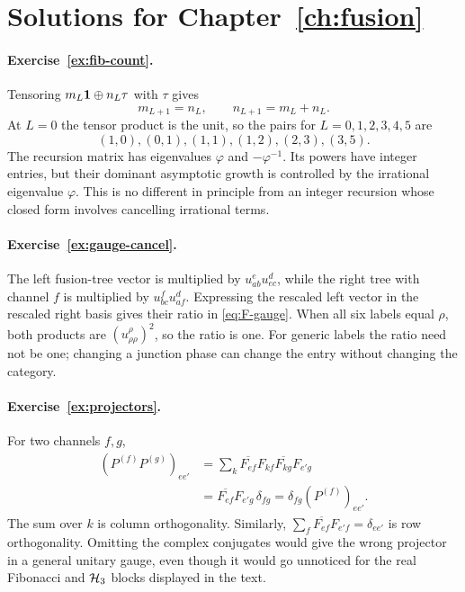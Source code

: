 \section{Solutions for Chapter~\ref{ch:fusion}}

\paragraph{Exercise~\ref{ex:fib-count}.}
\label{sol:ex:fib-count}
Tensoring $m_L\mathbf1\oplus n_L\tau$ with $\tau$ gives
\[
 m_{L+1}=n_L,\qquad n_{L+1}=m_L+n_L.
\]
At $L=0$ the tensor product is the unit, so the pairs for
$L=0,1,2,3,4,5$ are
\[
 (1,0),(0,1),(1,1),(1,2),(2,3),(3,5).
\]
The recursion matrix has eigenvalues $\varphi$ and
$-\varphi^{-1}$.  Its powers have integer entries, but their dominant
asymptotic growth is controlled by the irrational eigenvalue
$\varphi$.  This is no different in principle from an integer
recursion whose closed form involves cancelling irrational terms.



\paragraph{Exercise~\ref{ex:gauge-cancel}.}
\label{sol:ex:gauge-cancel}
The left fusion-tree vector is multiplied by
$u_{ab}^{e}u_{ec}^{d}$, while the right tree with channel $f$ is
multiplied by $u_{bc}^{f}u_{af}^{d}$.  Expressing the rescaled left
vector in the rescaled right basis gives their ratio in
\eqref{eq:F-gauge}.  When all six labels equal $\rho$, both
products are $(u_{\rho\rho}^{\rho})^2$, so the ratio is one.
For generic labels the ratio need not be one; changing a junction
phase can change the entry without changing the category.



\paragraph{Exercise~\ref{ex:projectors}.}
\label{sol:ex:projectors}
For two channels $f,g$,
\begin{align*}
 (P^{(f)}P^{(g)})_{ee'}
 &=\sum_k\overline{F_{ef}}F_{kf}
           \overline{F_{kg}}F_{e'g}\\
 &=\overline{F_{ef}}F_{e'g}\,\delta_{fg}
 =\delta_{fg}(P^{(f)})_{ee'}.
\end{align*}
The sum over $k$ is column orthogonality.  Similarly,
$\sum_f\overline{F_{ef}}F_{e'f}=\delta_{ee'}$ is row
orthogonality.  Omitting the complex conjugates would give the
wrong projector in a general unitary gauge, even though it would
go unnoticed for the real Fibonacci and $\mathcal H_3$ blocks displayed
in the text.



